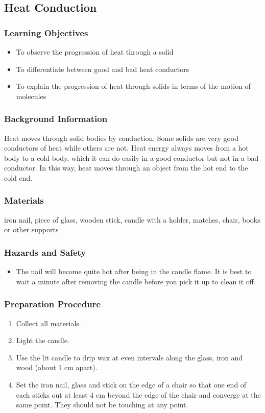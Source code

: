 \subsection{Heat Conduction}

\subsubsection*{Learning Objectives}
\begin{itemize}
\item{To observe the progression of heat through a solid} 
\item{To differentiate between good and bad heat conductors} 
\item{To explain the progression of heat through solids in terms of the motion of molecules} 
\end{itemize}

\subsubsection*{Background Information}
Heat moves through solid bodies by conduction. Some solids are very good conductors of heat while others are not. Heat energy always moves from a hot body to a cold body, which it can do easily in a good conductor but not in a bad conductor. In this way, heat moves through an object from the hot end to the cold end.  

\subsubsection*{Materials}
iron nail, piece of glass, wooden stick, candle with a holder, matches, chair, books or other supports

\subsubsection*{Hazards and Safety}
\begin{itemize}
\item{The nail will become quite hot after being in the candle flame. It is best to wait a minute after removing the candle before you pick it up to clean it off.} 
\end{itemize}

\subsubsection*{Preparation Procedure}
\begin{enumerate}
\item{Collect all materials.} 
\item{Light the candle.} 
\item{Use the lit candle to drip wax at even intervals along the glass, iron and wood (about 1 cm apart).} 
\item{Set the iron nail, glass and stick on the edge of a chair so that one end of each sticks out at least 4 cm beyond the edge of the chair and converge at the same point. They should not be touching at any point.} 
\end{enumerate}

